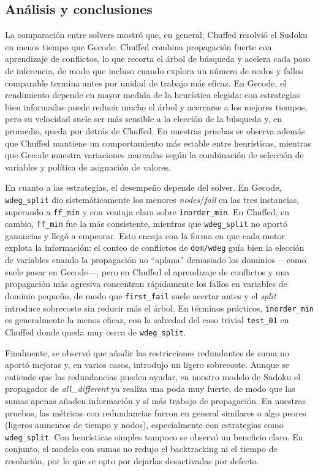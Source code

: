 
\subsection{Análisis y conclusiones}\label{sec:01-sudoku-analisis-y-conclusiones}
La comparación entre solvers mostró que, en general, Chuffed resolvió el Sudoku en menos tiempo que Gecode. Chuffed combina propagación fuerte con aprendizaje de conflictos, lo que recorta el árbol de búsqueda y acelera cada paso de inferencia, de modo que incluso cuando explora un número de nodos y fallos comparable  termina antes por unidad de trabajo más eficaz. En Gecode, el rendimiento depende en mayor medida de la heurística elegida: con estrategias bien informadas puede reducir mucho el árbol y acercarse a los mejores tiempos, pero su velocidad suele ser más sensible a la elección de la búsqueda y, en promedio, queda por detrás de Chuffed. En nuestras pruebas se observa además que Chuffed mantiene un comportamiento más estable entre heurísticas, mientras que Gecode muestra variaciones marcadas según la combinación de selección de variables y política de asignación de valores.

En cuanto a las estrategias, el desempeño depende del solver. En Gecode, \texttt{wdeg\_split} dio sistemáticamente los menores \emph{nodes}/\emph{fail} en las tres instancias, superando a \texttt{ff\_min} y con ventaja clara sobre \texttt{inorder\_min}. En Chuffed, en cambio, \texttt{ff\_min} fue la más consistente, mientras que \texttt{wdeg\_split} no aportó ganancias y llegó a empeorar. Esto encaja con la forma en que cada motor explota la información: el conteo de conflictos de \texttt{dom/wdeg} guía bien la elección de variables cuando la propagación no “aplana” demasiado los dominios —como suele pasar en Gecode—, pero en Chuffed el aprendizaje de conflictos y una propagación más agresiva concentran rápidamente los fallos en variables de dominio pequeño, de modo que \texttt{first\_fail} suele acertar antes y el \emph{split} introduce sobrecoste sin reducir más el árbol. En términos prácticos, \texttt{inorder\_min} es generalmente la menos eficaz, con la salvedad del caso trivial \texttt{test\_01} en Chuffed donde queda muy cerca de \texttt{wdeg\_split}.

Finalmente, se observó que añadir las restricciones redundantes de suma no aportó mejoras y, en varios casos, introdujo un ligero sobrecoste. Aunque se entiende que las redundancias pueden ayudar, en nuestro modelo de Sudoku el propagador de \textit{all\_different} ya realiza una poda muy fuerte, de modo que las sumas apenas añaden información y sí más trabajo de propagación. En nuestras pruebas, las métricas con redundancias fueron en general similares o algo peores (ligeros aumentos de tiempo y nodos), especialmente con estrategias como \texttt{wdeg\_split}. Con heurísticas simples tampoco se observó un beneficio claro. En conjunto, el modelo con sumas no redujo el backtracking ni el tiempo de resolución, por lo que se opto por dejarlas desactivadas por defecto.

